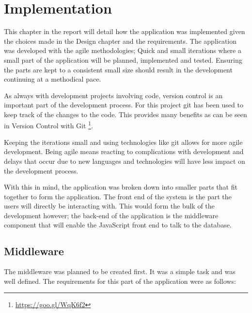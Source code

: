 \chapter{Implementation}\label{implementation}

This chapter in the report will detail how the application was
implemented given the choices made in the Design chapter and the
requirements. The application was developed with the agile methodologies;
Quick and small iterations where a small part of the application will be
planned, implemented and tested. Ensuring the parts are kept to a
consistent small size should result in the development continuing at a
methodical pace.

As always with development projects involving code, version control is an
important part of the development process. For this project git has been
used to keep track of the changes to the code. This provides many
benefits as can be seen in Version Control with Git%
\footnote{\url{https://goo.gl/WqK6f2}}.

Keeping the iterations small and using technologies like git allows for more
agile development. Being agile means reacting to complications with development
and delays that occur due to new languages and technologies will have less
impact on the development process.

With this in mind, the application was broken down into smaller parts
that fit together to form the application. The front end of the system
is the part the users will directly be interacting with. This would form
the bulk of the development however; the back-end of the application is
the middleware component that will enable the JavaScript front end to
talk to the database.

\section{Middleware}\label{middleware}

The middleware was planned to be created first. It was a simple task and
was well defined. The requirements for this part of the application were
as follows:

